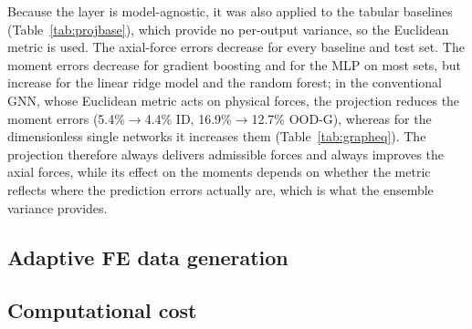 Because the layer is model-agnostic, it was also applied to the tabular baselines (Table~\ref{tab:projbase}), which provide no per-output variance, so the Euclidean metric is used. The axial-force errors decrease for every baseline and test set. The moment errors decrease for gradient boosting and for the MLP on most sets, but increase for the linear ridge model and the random forest; in the conventional GNN, whose Euclidean metric acts on physical forces, the projection reduces the moment errors (5.4\%$\to$4.4\% ID, 16.9\%$\to$12.7\% OOD-G), whereas for the dimensionless single networks it increases them (Table~\ref{tab:grapheq}). The projection therefore always delivers admissible forces and always improves the axial forces, while its effect on the moments depends on whether the metric reflects where the prediction errors actually are, which is what the ensemble variance provides.







\subsection{Adaptive FE data generation}\label{sec:adaptive}


\subsection{Computational cost}\label{sec:cost}

